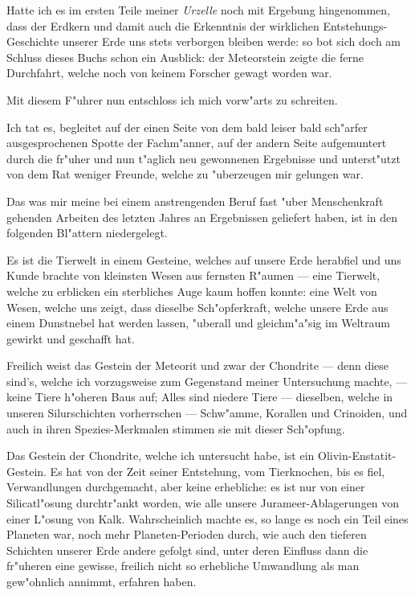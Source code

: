 \documentclass[a4paper, 11pt, oneside]{article}
\begin{document}
Hatte ich es im ersten Teile meiner \emph{Urzelle} noch mit Ergebung hingenommen, dass der Erdkern und damit auch die Erkenntnis der wirklichen Entstehungs-Geschichte unserer Erde uns stets verborgen bleiben werde: so bot sich doch am Schluss dieses Buchs schon ein Ausblick: der Meteorstein zeigte die ferne Durchfahrt, welche noch von keinem Forscher gewagt worden war.

Mit diesem F"uhrer nun entschloss ich mich vorw"arts zu schreiten.

Ich tat es, begleitet auf der einen Seite von dem bald leiser bald sch"arfer ausgesprochenen Spotte der Fachm"anner, auf der andern Seite aufgemuntert durch die fr"uher und nun t"aglich neu gewonnenen Ergebnisse und unterst"utzt von dem Rat weniger Freunde, welche zu "uberzeugen mir gelungen war.

Das was mir meine bei einem anstrengenden Beruf fast "uber Menschenkraft gehenden Arbeiten des letzten Jahres an Ergebnissen geliefert haben, ist in den folgenden Bl"attern niedergelegt.

Es ist die Tierwelt in einem Gesteine, welches auf unsere Erde herabfiel und uns Kunde brachte von kleinsten Wesen aus fernsten R"aumen --- eine Tierwelt, welche zu erblicken ein sterbliches Auge kaum hoffen konnte: eine Welt von Wesen, welche uns zeigt, dass dieselbe Sch"opferkraft, welche unsere Erde aus einem Dunstnebel hat werden lassen, "uberall und gleichm"a"sig im Weltraum gewirkt und geschafft hat.

Freilich weist das Gestein der Meteorit und zwar der Chondrite --- denn diese sind's, welche ich vorzugsweise zum Gegenstand meiner Untersuchung machte, --- keine Tiere h"oheren Baus auf; Alles sind niedere Tiere --- dieselben, welche in unseren Silurschichten vorherrschen --- Schw"amme, Korallen und Crinoiden, und auch in ihren Spezies-Merkmalen stimmen sie mit dieser Sch"opfung.

Das Gestein der Chondrite, welche ich untersucht habe, ist ein Olivin-Enstatit-Gestein. Es hat von der Zeit seiner Entstehung, vom Tierknochen, bis es fiel, Verwandlungen durchgemacht, aber keine erhebliche: es ist nur von einer Silicatl"osung durchtr"ankt worden, wie alle unsere Jurameer-Ablagerungen von einer L"osung von Kalk. Wahrscheinlich machte es, so lange es noch ein Teil eines Planeten war, noch mehr Planeten-Perioden durch, wie auch den tieferen Schichten unserer Erde andere gefolgt sind, unter deren Einfluss dann die fr"uheren eine gewisse, freilich nicht so erhebliche Umwandlung als man gew"ohnlich annimmt, erfahren haben.
\end{document}
